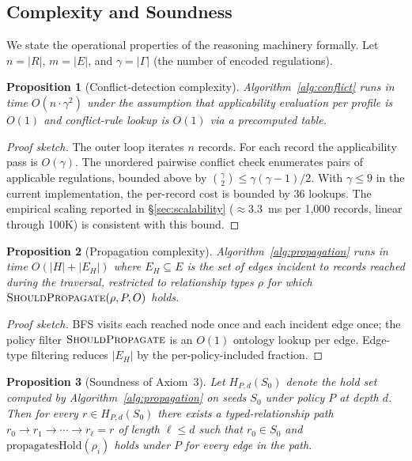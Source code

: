 \documentclass{ieeeaccess}
\newtheorem{proposition}{Proposition}
\begin{document}
\subsection{Complexity and Soundness}

We state the operational properties of the reasoning machinery formally. Let $n = |R|$, $m = |E|$, and $\gamma = |\Gamma|$ (the number of encoded regulations).

\begin{proposition}[Conflict-detection complexity]
Algorithm~\ref{alg:conflict} runs in time $O(n \cdot \gamma^2)$ under the assumption that applicability evaluation per profile is $O(1)$ and conflict-rule lookup is $O(1)$ via a precomputed table.
\end{proposition}

\begin{proof}[Proof sketch]
The outer loop iterates $n$ records. For each record the applicability pass is $O(\gamma)$. The unordered pairwise conflict check enumerates pairs of applicable regulations, bounded above by $\binom{\gamma}{2} \leq \gamma(\gamma-1)/2$. With $\gamma \leq 9$ in the current implementation, the per-record cost is bounded by 36 lookups. The empirical scaling reported in §\ref{sec:scalability} ($\approx 3.3$~ms per 1{,}000 records, linear through 100K) is consistent with this bound.
\end{proof}

\begin{proposition}[Propagation complexity]
Algorithm~\ref{alg:propagation} runs in time $O(|H| + |E_H|)$ where $E_H \subseteq E$ is the set of edges incident to records reached during the traversal, restricted to relationship types $\rho$ for which $\textsc{ShouldPropagate}(\rho, P, O)$ holds.
\end{proposition}

\begin{proof}[Proof sketch]
BFS visits each reached node once and each incident edge once; the policy filter $\textsc{ShouldPropagate}$ is an $O(1)$ ontology lookup per edge. Edge-type filtering reduces $|E_H|$ by the per-policy-included fraction.
\end{proof}

\begin{proposition}[Soundness of Axiom~3]
Let $H_{P,d}(S_0)$ denote the hold set computed by Algorithm~\ref{alg:propagation} on seeds $S_0$ under policy $P$ at depth $d$. Then for every $r \in H_{P,d}(S_0)$ there exists a typed-relationship path $r_0 \to r_1 \to \cdots \to r_\ell = r$ of length $\ell \leq d$ such that $r_0 \in S_0$ and $\mathrm{propagatesHold}(\rho_i)$ holds under $P$ for every edge in the path.
\end{proposition}
\end{document}
